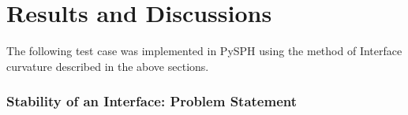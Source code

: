 \chapter{Results and Discussions}
The following test case was implemented in PySPH using the method of Interface curvature described in the above sections. \\


\subsection{Stability of an Interface: Problem Statement}

